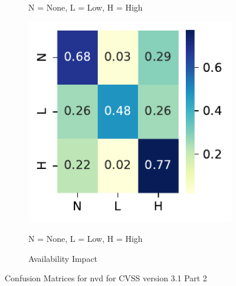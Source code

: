 \documentclass[12pt]{article}
\begin{document}
\begin{figure}
\begin{subfigure}[b]{0.45\textwidth}
		\begin{tablenotes}
			\footnotesize
			\item \quad N = None, L = Low, H = High
		\end{tablenotes}
	\end{subfigure}
	\hfill
	\begin{subfigure}[b]{0.45\textwidth}
		\includegraphics[width=\textwidth]{./figures/confusion_matrices/availability_impact_nvd.pdf}
		\caption{Availability Impact}

		\begin{tablenotes}
			\footnotesize
			\item \quad N = None, L = Low, H = High
		\end{tablenotes}
	\end{subfigure}

	\caption{\label{fig:nvd_31_confusion_matrices_2}Confusion Matrices for nvd for CVSS version 3.1 Part 2}
\end{figure}


\end{document}
